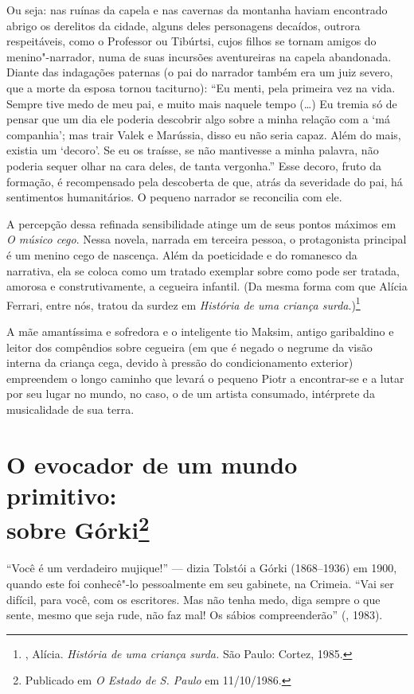 Ou seja: nas ruínas da capela e nas cavernas da montanha haviam
encontrado abrigo os derelitos da cidade, alguns deles personagens
decaídos, outrora respeitáveis, como o Professor ou Tibúrtsi, cujos
filhos se tornam amigos do menino"-narrador, numa de suas incursões
aventureiras na capela abandonada. Diante das indagações paternas (o pai
do narrador também era um juiz severo, que a morte da esposa tornou
taciturno): ``Eu menti, pela primeira vez na vida. Sempre tive medo de
meu pai, e muito mais naquele tempo (\ldots{}) Eu tremia só de pensar que um
dia ele poderia descobrir algo sobre a minha relação com a `má
companhia'; mas trair Valek e Marússia, disso eu não seria capaz. Além
do mais, existia um `decoro'. Se eu os traísse, se não mantivesse a
minha palavra, não poderia sequer olhar na cara deles, de tanta
vergonha.'' Esse decoro, fruto da formação, é recompensado pela
descoberta de que, atrás da severidade do pai, há sentimentos
humanitários. O pequeno narrador se reconcilia com ele.

A percepção dessa refinada sensibilidade atinge um de seus pontos
máximos em \emph{O músico cego}. Nessa novela, narrada em terceira
pessoa, o protagonista principal é um menino cego de nascença. Além
da poeticidade e do romanesco da narrativa, ela se coloca como um
tratado exemplar sobre como pode ser tratada, amorosa e construtivamente,
a cegueira infantil. (Da mesma forma com que Alícia Ferrari, entre nós,
tratou da surdez em \emph{História de uma criança
surda}.)\footnote{, Alícia. \emph{História de uma
criança surda.} São Paulo: Cortez, 1985.}

A mãe amantíssima e sofredora e o inteligente tio Maksim, antigo
garibaldino e leitor dos compêndios sobre cegueira (em que é negado
o negrume da visão interna da criança cega, devido à pressão do
condicionamento exterior) empreendem o longo caminho que levará o
pequeno Piotr a encontrar-se e a lutar por seu lugar no mundo, no
caso, o de um artista consumado, intérprete da musicalidade de sua
terra.

\chapter{O evocador de um mundo primitivo:\\
 sobre Górki\footnote{Publicado em \emph{O Estado de S. Paulo} em 11/10/1986.}}
\label{primitivo}

``Você é um verdadeiro mujique!'' --- dizia Tolstói a Górki
(1868--1936) em 1900, quando este foi conhecê"-lo pessoalmente em
seu gabinete, na Crimeia. ``Vai ser difícil, para você, com os
escritores. Mas não tenha medo, diga sempre o que sente, mesmo
que seja rude, não faz mal! Os sábios compreenderão'' (, 1983).

